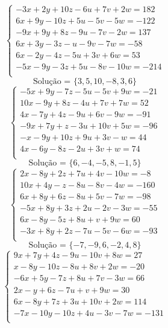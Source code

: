 \documentclass[12pt,oneside,a4paper]{article}
\begin{document}
\vspace{\baselineskip}
\begin{equation*}
\begin{cases}
-3x+2y+10z-6u+7v+2w=182 \\
6x+9y-10z+5u-5v-5w=-122 \\
-9x+9y+8z-9u-7v-2w=137 \\
6x+3y-3z-u-9v-7w=-58 \\
6x-2y-4z-5u+3v+6w=53 \\
-5x-9y-3z+5u-8v-10w=-214 \\
\end{cases}
\end{equation*}
\begin{equation*}
\text{Solução = }\{3,5,10,-8,3,6\}
\end{equation*}
\vspace{\baselineskip}
\begin{equation*}
\begin{cases}
-5x+9y-7z-5u-5v+9w=-21 \\
10x-9y+8z-4u+7v+7w=52 \\
4x-7y+4z-9u+6v-9w=-91 \\
-9x+7y+z-3u+10v+5w=-96 \\
-x-9y+10z+9u+3v-w=44 \\
4x-6y-8z-2u+3v+w=74 \\
\end{cases}
\end{equation*}
\begin{equation*}
\text{Solução = }\{6,-4,-5,8,-1,5\}
\end{equation*}
\vspace{\baselineskip}
\begin{equation*}
\begin{cases}
2x-8y+2z+7u+4v-10w=-8 \\
10x+4y-z-8u-8v-4w=-160 \\
6x+8y+6z-8u+5v-7w=-98 \\
-5x+8y+3z+2u-2v-3w=-55 \\
6x-8y-5z+8u+v+9w=60 \\
-3x+8y+2z-7u-5v-6w=-93 \\
\end{cases}
\end{equation*}
\begin{equation*}
\text{Solução = }\{-7,-9,6,-2,4,8\}
\end{equation*}
\vspace{\baselineskip}
\begin{equation*}
\begin{cases}
9x+7y+4z-9u-10v+8w=27 \\
x-8y-10z-8u+8v+2w=-20 \\
-6x+5y-7z+8u+7v-3w=66 \\
2x-y+6z-7u+v+9w=30 \\
6x-8y+7z+3u+10v+2w=114 \\
-7x-10y-10z+4u-3v-7w=-131 \\
\end{cases}
\end{equation*}
\end{document}
